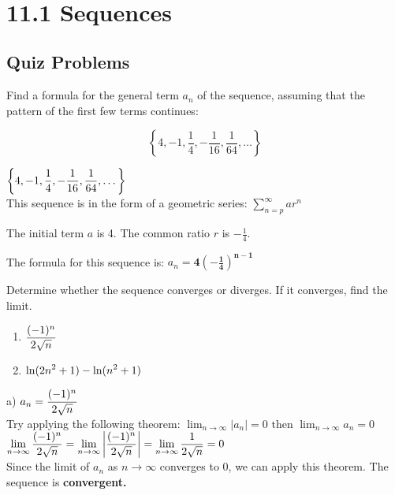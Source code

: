 \documentclass[12pt]{article}
\title{
    \vspace{2in}
    \textmd{\textbf{\hmwkTitle}}\\
    \large\vspace{0.1in}{\hmwkClass}\\
    \large\vspace{0.1in}{\textbf{Date: }\hmwkDueDate}\\
    \vspace{0.1in}{\textbf{Professor: }\hmwkClassInstructor}
    \vspace{1in}
}
\author{\hmwkAuthorName}
\date{}
\newcommand{\inftylim}[1]{\mathlarger{\lim_{n \to \infty}#1}}
\begin{document}
\section*{11.1 Sequences}
\subsection*{Quiz Problems}
Find a formula for the general term $a_n$ of the sequence, assuming that the pattern of the first few terms continues: 

$$\left\lbrace 4, -1, \frac{1}{4}, -\frac{1}{16}, \frac{1}{64}, \dots \right\rbrace$$

\begin{solution}
$\mathlarger{\left\lbrace 4, -1, \frac{1}{4}, -\frac{1}{16}, \frac{1}{64}, \dots \right\rbrace}$ ~\\

This sequence is in the form of a geometric series: $\sum\limits_{n=p}^{\infty} ar^n$

The initial term $a$ is 4. The common ratio $r$ is $-\frac{1}{4}$.

The formula for this sequence is: $a_n = \mathbf{4\left(-\frac{1}{4}\right)^{n-1}}$
\end{solution}

Determine whether the sequence converges or diverges. If it converges, find the limit.
\begin{enumerate}[label=\alph*)]
\item $\mathlarger{\frac{(-1)^{n}}{2\sqrt{n}}}$
\item $\mathlarger{\ln(2n^{2} + 1) - \ln(n^{2} + 1)}$
\end{enumerate}
\begin{solution}
a) $a_n = \mathlarger{\frac{(-1)^{n}}{2\sqrt{n}}} $  ~\\

Try applying the following theorem: $\lim_{n \to \infty}{\left| a_n\right|} = 0  \text{ then }  \lim_{n \to \infty}{a_n} = 0$~\\

$\inftylim{{\frac{(-1)^{n}}{2\sqrt{n}}}} = \inftylim{{\left| \frac{(-1)^{n}}{2\sqrt{n}}\right|}} = \inftylim{\frac{1}{2\sqrt{n}}} = 0 $ ~\\

Since the limit of $a_n$ as $n \to \infty$ converges to 0, we can apply this theorem. The sequence is \textbf{convergent.}
\end{solution}
\end{document}
